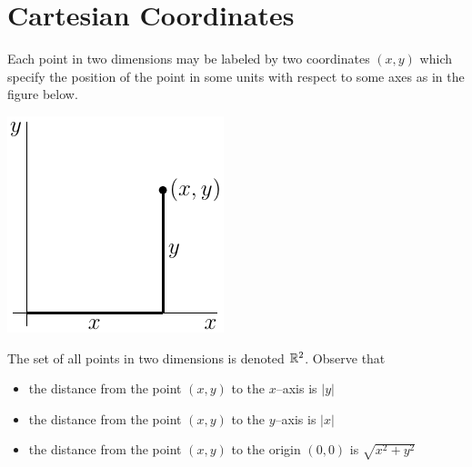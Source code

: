 %
%
\graphicspath{{figures/cartesian/}}

\section{Cartesian Coordinates}

Each point in two dimensions may be labeled by two coordinates
$(x,y)$ which specify the position of the point in some units with respect
to some axes as in the figure below.
\begin{efig}
\begin{center}
   \includegraphics{point2d}
\end{center}
\end{efig}
The set of all points in two dimensions is denoted $\mathbb{R}^2$.
Observe that
\begin{itemize}\itemsep1pt \parskip0pt 
\item the distance from the point $(x,y)$ to the $x$--axis is $|y|$
\item the distance from the point $(x,y)$ to the $y$--axis is $|x|$
\item the distance from the point $(x,y)$ to the origin $(0,0)$ is
     $\sqrt{x^2+y^2}$
\end{itemize}

